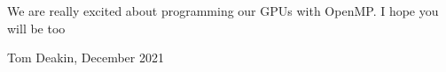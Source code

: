 
\noindent
We are really excited about programming our GPUs with OpenMP.  I hope you will be too



\bigskip

\author{Tom Deakin}
\date{December, 2021}

\null\hfill Tom Deakin, December 2021\\

